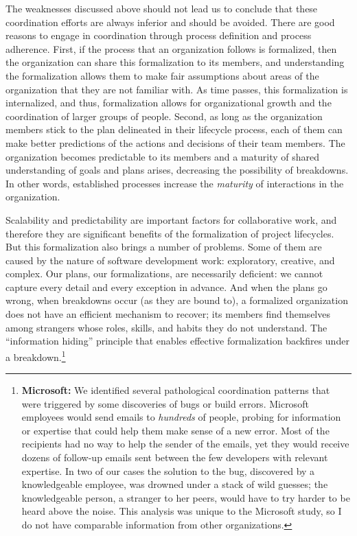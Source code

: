 The weaknesses discussed above should not lead us to conclude that these coordination efforts are always inferior and should be avoided. There are good reasons to engage in coordination through process definition and process adherence. First, if the process that an organization follows is formalized, then the organization can share this formalization to its members, and understanding the formalization allows them to make fair assumptions about areas of the organization that they are not familiar with. As time passes, this formalization is internalized, and thus, formalization allows for organizational growth and the coordination of larger groups of people. Second, as long as the organization members stick to the plan delineated in their lifecycle process, each of them can make better predictions of the actions and decisions of their team members. The organization becomes predictable to its members and a maturity of shared understanding of goals and plans arises, decreasing the possibility of breakdowns. In other words, established processes increase the \emph{maturity} of interactions in the organization.

Scalability and predictability are important factors for collaborative work, and therefore they are significant benefits of the formalization of project lifecycles. But this formalization also brings a number of problems. Some of them are caused by the nature of software development work: exploratory, creative, and complex. Our plans, our formalizations, are necessarily deficient: we cannot capture every detail and every exception in advance. And when the plans go wrong, when breakdowns occur (as they are bound to), a formalized organization does not have an efficient mechanism to recover; its members find themselves among strangers whose roles, skills, and habits they do not understand. The ``information hiding'' principle that enables effective formalization backfires under a breakdown.\footnote{\textbf{Microsoft:} We identified several pathological coordination patterns that were triggered by some discoveries of bugs or build errors. Microsoft employees would send emails to \emph{hundreds} of people, probing for information or expertise that could help them make sense of a new error. Most of the recipients had no way to help the sender of the emails, yet they would receive dozens of follow-up emails sent between the few developers with relevant expertise. In two of our cases the solution to the bug, discovered by a knowledgeable employee, was drowned under a stack of wild guesses; the knowledgeable person, a stranger to her peers, would have to try harder to be heard above the noise. This analysis was unique to the Microsoft study, so I do not have comparable information from other organizations.}

